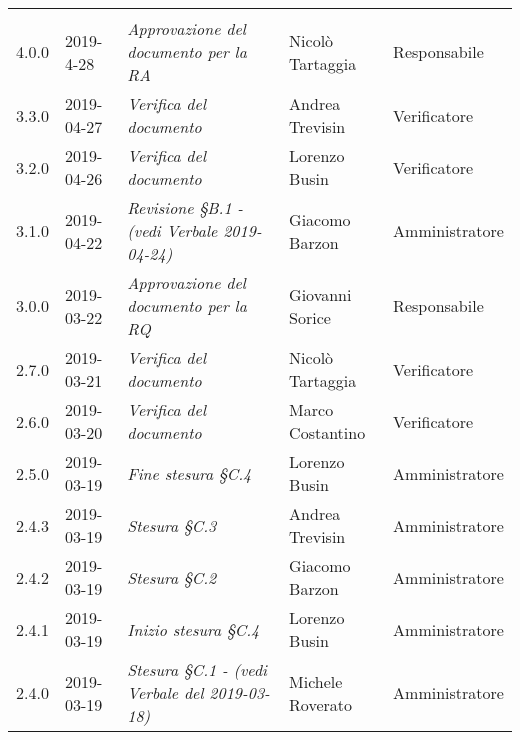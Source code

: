 \newpage 
\section*{}
	\begin{longtable}{C{2cm}|C{2.5cm}|C{4.5cm}|C{2.5cm}|C{3cm}}

	 &  &  &  &   \\
	\endhead
	
		4.0.0 & 2019-4-28 & \emph{Approvazione del documento per la RA} & Nicolò Tartaggia & Responsabile \\
		\hline
	
		3.3.0 & 2019-04-27 & \emph{Verifica del documento} & Andrea Trevisin & Verificatore\\
		\hline

		3.2.0 & 2019-04-26 & \emph{Verifica del documento} & Lorenzo Busin & Verificatore\\
		\hline
		
		3.1.0 & 2019-04-22 & \emph{Revisione §B.1 - (vedi Verbale 2019-04-24)} & Giacomo Barzon & Amministratore \\
		\hline
	
		3.0.0 & 2019-03-22 & \emph{Approvazione del documento per la RQ} & Giovanni Sorice & Responsabile \\
		\hline
		
		2.7.0 & 2019-03-21 & \emph{Verifica del documento} & Nicolò Tartaggia & Verificatore \\
		\hline
		
		2.6.0 & 2019-03-20 & \emph{Verifica del documento} & Marco Costantino & Verificatore \\
		\hline
		
		2.5.0 & 2019-03-19 & \emph{Fine stesura §C.4} & Lorenzo Busin & Amministratore \\
		\hline
		
		2.4.3 & 2019-03-19 & \emph{Stesura §C.3} & Andrea Trevisin & Amministratore \\
		\hline
		
		2.4.2 & 2019-03-19 & \emph{Stesura §C.2} & Giacomo Barzon & Amministratore \\
		\hline
		
		2.4.1 & 2019-03-19 & \emph{Inizio stesura §C.4} & Lorenzo Busin & Amministratore \\
		\hline
		
		2.4.0 & 2019-03-19 & \emph{Stesura §C.1 - (vedi Verbale del 2019-03-18)} & Michele Roverato & Amministratore \\
		\hline
		

\end{longtable}
